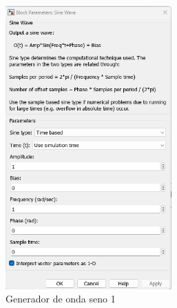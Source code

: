 \begin{figure}[htbp]
    \centering
    \begin{subfigure}[b]{0.45\textwidth}
        \centering
        \includegraphics[width=0.7\textwidth]{fig/especifico_2/CASO_ESTUDIO_FILTRO/sinewave_1.png}
        \caption{Generador de onda seno 1}
        \label{fig:sine_gen_01}
    \end{subfigure}
    \hfill
    \begin{subfigure}[b]{0.45\textwidth}
        \centering

\end{subfigure}
\end{figure}
